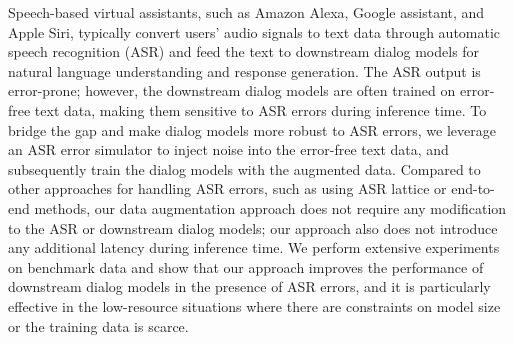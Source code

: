 Speech-based virtual assistants, such as Amazon Alexa, Google assistant, and Apple Siri, typically convert users' audio signals to text data through automatic speech recognition (ASR) and feed the text to downstream dialog models for natural language understanding and response generation. The ASR output is error-prone; however, the downstream dialog models are often trained on error-free text data, making them sensitive to ASR errors during inference time. To bridge the gap and make dialog models more robust to ASR errors, we leverage an ASR error simulator to inject noise into the error-free text data, and subsequently train the dialog models with the augmented data. Compared to other approaches for handling ASR errors, such as using ASR lattice or end-to-end methods, our data augmentation approach does not require any modification to the ASR or downstream dialog models; our approach also does not introduce any additional latency during inference time. We perform extensive experiments on benchmark data and show that our approach improves the performance of downstream dialog models in the presence of ASR errors, and it is particularly effective in the low-resource situations where there are constraints on model size or the training data is scarce.
